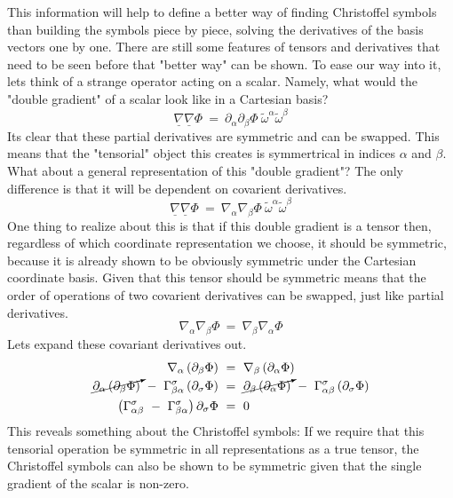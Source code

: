 \hskip 25pt This information will help to define a better way of finding Christoffel symbols than building the symbols
piece by piece, solving the derivatives of the basis vectors one by one.  There are still some features of tensors and
derivatives that need to be seen before that "better way" can be shown.  To ease our way into it, lets think of a
strange operator acting on a scalar.  Namely, what would the "double gradient" of a scalar look like in a Cartesian
basis?
\begin{equation}
  \underline{\nabla}\underline{\nabla}\Phi\ =\
  \partial_{\alpha}\partial_{\beta}\Phi\ \widetilde{\omega}^{\alpha}\widetilde{\omega}^{\beta}
\end{equation}
Its clear that these partial derivatives are symmetric and can be swapped.  This means that the "tensorial" object
this creates is symmertrical in indices $\alpha$ and $\beta$.  What about a general representation of this "double
gradient"?  The only difference is that it will be dependent on covarient derivatives.
\begin{equation}
  \underline{\nabla}\underline{\nabla}\Phi\ =\
  \nabla_{\alpha}\nabla_{\beta}\Phi\ \widetilde{\omega}^{\alpha}\widetilde{\omega}^{\beta}
\end{equation}
One thing to realize about this is that if this double gradient is a tensor then, regardless of which coordinate
representation we choose, it should be symmetric, because it is already shown to be obviously symmetric under the
Cartesian coordinate basis.  Given that this tensor should be symmetric means that the order of operations of
two covarient derivatives can be swapped, just like partial derivatives.
\begin{equation}
  \nabla_{\alpha}\nabla_{\beta}\Phi\ =\ \nabla_{\beta}\nabla_{\alpha}\Phi
\end{equation}
Lets expand these covariant derivatives out.
\begin{equation}
  \begin{aligned}
    \nabla_{\alpha}\left (\partial_{\beta}\Phi\right )\ &=\ \nabla_{\beta}\left (\partial_{\alpha}\Phi\right ) \\
    \cancelto{}{\partial_{\alpha}\left (\partial_{\beta}\Phi\right )}\
    -\ \Gamma^{\sigma}_{\beta\alpha}\left (\partial_{\sigma}\Phi\right )\ &=\
    \cancelto{}{\partial_{\beta}\left (\partial_{\alpha}\Phi\right )}\
    -\ \Gamma^{\sigma}_{\alpha\beta}\left (\partial_{\sigma}\Phi\right ) \\
    \left (\Gamma^{\sigma}_{\alpha\beta}\ -\ \Gamma^{\sigma}_{\beta\alpha}\right )\partial_{\sigma}\Phi\ &=\ 0
  \end{aligned}
\end{equation}
This reveals something about the Christoffel symbols: If we require that this tensorial operation be symmetric in all
representations as a true tensor, the Christoffel symbols can also be shown to be symmetric given that the
single gradient of the scalar is non-zero.

